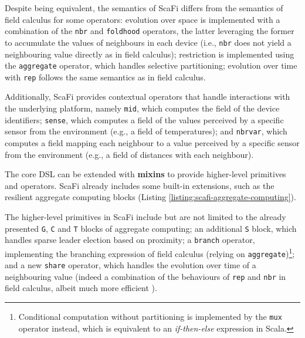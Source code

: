 Despite being equivalent, the semantics of \ac{ScaFi} differs from the
semantics of field calculus for some operators: evolution over space is
implemented with a combination of the \texttt{nbr} and \texttt{foldhood}
operators, the latter leveraging the former to accumulate the values of
neighbours in each device (i.e., \texttt{nbr} does not yield a neighbouring
value directly as in field calculus); restriction is implemented using the
\texttt{aggregate} operator, which handles selective partitioning; evolution
over time with \texttt{rep} follows the same semantics as in field calculus.

Additionally, \ac{ScaFi} provides contextual operators that handle interactions
with the underlying platform, namely \texttt{mid}, which computes the field of
the device identifiers; \texttt{sense}, which computes a field of the values
perceived by a specific sensor from the environment (e.g., a field of
temperatures); and \texttt{nbrvar}, which computes a field mapping each
neighbour to a value perceived by a specific sensor from the environment (e.g.,
a field of distances with each neighbour).

The core \ac{DSL} can be extended with \textbf{mixins} to provide higher-level
primitives and operators. \ac{ScaFi} already includes some built-in extensions,
such as the resilient aggregate computing blocks (Listing
\ref{listing:scafi-aggregate-computing}).



The higher-level primitives in \ac{ScaFi} include but are not limited to the
already presented \texttt{G}, \texttt{C} and \texttt{T} blocks of aggregate
computing; an additional \texttt{S} block, which handles sparse leader election
based on proximity; a \texttt{branch} operator, implementing the branching
expression of field calculus (relying on
\texttt{aggregate})\footnote{Conditional computation without partitioning is
implemented by the \texttt{mux} operator instead, which is equivalent to an
\textit{if-then-else} expression in Scala.}; and a new \texttt{share} operator,
which handles the evolution over time of a neighbouring value (indeed a
combination of the behaviours of \texttt{rep} and \texttt{nbr} in field
calculus, albeit much more efficient \cite{ScaFi-ShareOperator}).

